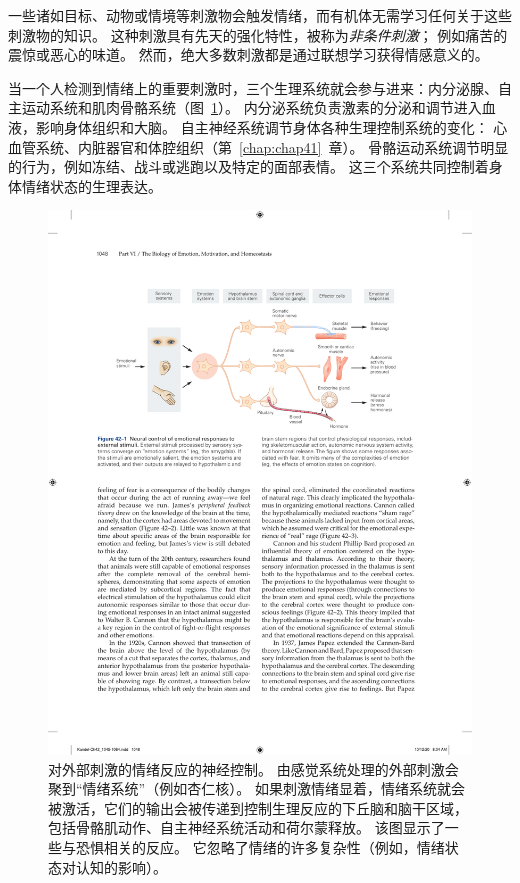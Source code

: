 一些诸如目标、动物或情境等刺激物会触发情绪，而有机体无需学习任何关于这些刺激物的知识。
这种刺激具有先天的强化特性，被称为\textit{非条件刺激}；
例如痛苦的震惊或恶心的味道。
然而，绝大多数刺激都是通过联想学习获得情感意义的。


当一个人检测到情绪上的重要刺激时，三个生理系统就会参与进来：内分泌腺、自主运动系统和肌肉骨骼系统（图~\ref{fig:42_1}）。
内分泌系统负责激素的分泌和调节进入血液，影响身体组织和大脑。
自主神经系统调节身体各种生理控制系统的变化：
心血管系统、内脏器官和体腔组织（第~\ref{chap:chap41}~章）。
骨骼运动系统调节明显的行为，例如冻结、战斗或逃跑以及特定的面部表情。
这三个系统共同控制着身体情绪状态的生理表达。


\begin{figure}[htbp]
	\centering
	\includegraphics[width=0.85\linewidth]{chap42/fig_42_1}
	\caption{对外部刺激的情绪反应的神经控制。
		由感觉系统处理的外部刺激会聚到“情绪系统”（例如杏仁核）。
		如果刺激情绪显着，情绪系统就会被激活，它们的输出会被传递到控制生理反应的下丘脑和脑干区域，包括骨骼肌动作、自主神经系统活动和荷尔蒙释放。
		该图显示了一些与恐惧相关的反应。
		它忽略了情绪的许多复杂性（例如，情绪状态对认知的影响）。}
	\label{fig:42_1}
\end{figure}


